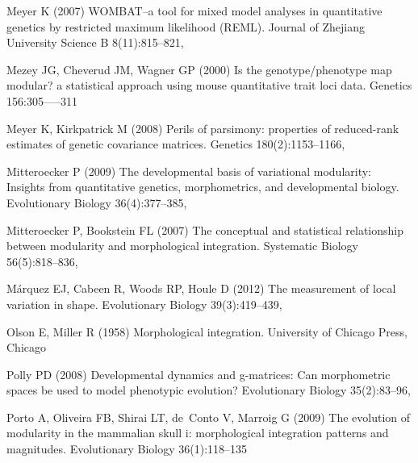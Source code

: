 \documentclass [twocolumn, natbib, nospthms, 10pt] {svjour3}
\begin{document}
\begin{thebibliography}{77}
Meyer K (2007) {WOMBAT}--a tool for mixed model analyses in quantitative
  genetics by restricted maximum likelihood ({REML}). Journal of Zhejiang
  University Science B 8(11):815--821, 

Mezey JG, Cheverud JM, Wagner GP (2000) Is the genotype/phenotype map modular?
  a statistical approach using mouse quantitative trait loci data. Genetics
  156:305—--311

Meyer K, Kirkpatrick M (2008) Perils of parsimony: properties of reduced-rank
  estimates of genetic covariance matrices. Genetics 180(2):1153–1166,

Mitteroecker P (2009) The developmental basis of variational modularity:
  Insights from quantitative genetics, morphometrics, and developmental
  biology. Evolutionary Biology 36(4):377–385,

Mitteroecker P, Bookstein FL (2007) The conceptual and statistical relationship
  between modularity and morphological integration. Systematic Biology
  56(5):818–836, 

Márquez EJ, Cabeen R, Woods RP, Houle D (2012) The measurement of local
  variation in shape. Evolutionary Biology 39(3):419–439,

Olson E, Miller R (1958) Morphological integration. University of Chicago
  Press, Chicago

Polly PD (2008) Developmental dynamics and g-matrices: Can morphometric spaces
  be used to model phenotypic evolution? Evolutionary Biology 35(2):83–96,

Porto A, Oliveira FB, Shirai LT, de~Conto V, Marroig G (2009) The evolution of
  modularity in the mammalian skull i: morphological integration patterns and
  magnitudes. Evolutionary Biology 36(1):118–135


\end{thebibliography}
\end{document}
